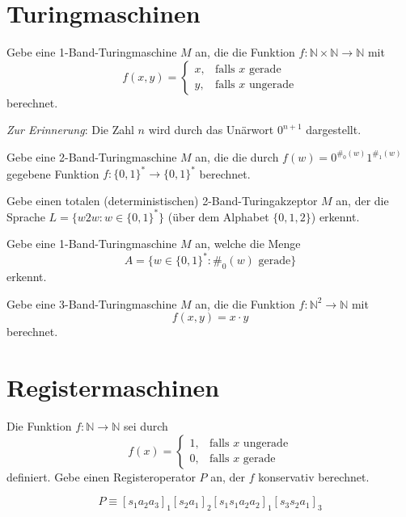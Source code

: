 \documentclass[german,headsepline]{scrartcl}
\theoremstyle{definition}
\begin{document}
	
	\section{Turingmaschinen}
	\begin{question}[subtitle={Klausur 2012}]
		Gebe eine 1-Band-Turingmaschine $M$ an,
		die die Funktion $f:\mathbb{N}\times\mathbb{N}\to\mathbb{N}$ mit
		\[f(x,y)=\begin{cases}
			x, &\text{falls $x$ gerade} \\
			y, &\text{falls $x$ ungerade}
		\end{cases}\]
		berechnet.
		
		\textit{Zur Erinnerung}: Die Zahl $n$ wird durch das Unärwort $0^{n+1}$ dargestellt.
	\end{question}
	
	\begin{question}[subtitle={Klausur 2014}]
		Gebe eine 2-Band-Turingmaschine $M$ an, die die durch $f(w)=0^{\#_0(w)}1^{\#_1(w)}$ gegebene Funktion $f:\{0,1\}^*\to\{0,1\}^*$ berechnet.
	\end{question}
	
	\begin{question}[subtitle={Klausur 2015}]
		Gebe einen totalen (deterministischen) 2-Band-Turingakzeptor $M$ an,
		der die Sprache $L=\{w2w\colon w\in\{0,1\}^*\}$ (über dem Alphabet $\{0,1,2\}$) erkennt.
	\end{question}
	
	\begin{question}[subtitle={Blatt 13, 2015}]
		Gebe eine 1-Band-Turingmaschine $M$ an, welche die Menge
		\[A=\{w\in\{0,1\}^*\colon\#_0(w)\text{ gerade}\}\]
		erkennt.
	\end{question}
	
	\begin{question}
		Gebe eine 3-Band-Turingmaschine $M$ an, die die Funktion $f:\mathbb{N}^2\to\mathbb{N}$ mit
		\[f(x,y)=x\cdot y\]
		berechnet.
	\end{question}
	
	\section{Registermaschinen}
	\begin{question}[subtitle={Klausur 2015}]
		Die Funktion $f:\mathbb{N}\to\mathbb{N}$ sei durch
		\[f(x)=\begin{cases}
			1, &\text{falls $x$ ungerade} \\
			0, &\text{falls $x$ gerade}
		\end{cases}\]
		definiert.
		Gebe einen Registeroperator $P$ an, der $f$ konservativ berechnet.
	\end{question}
	\begin{solution}
		\[P\equiv[s_1a_2a_3]_1[s_2a_1]_2[s_1s_1a_2a_2]_1[s_3s_2a_1]_3\]
	\end{solution}
	
\end{document}
